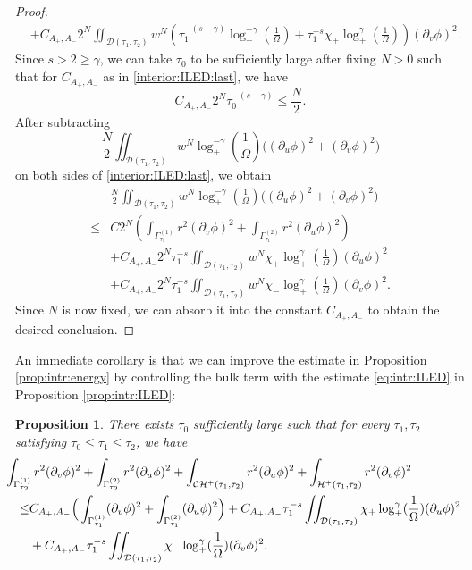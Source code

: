 \documentclass[10pt, reqno]{amsart}
\newtheorem{proposition}[theorem]{Proposition}
\theoremstyle{definition}
\theoremstyle{remark}
\numberwithin{equation}{section}
\newcommand{\rd}{\partial}
\newcommand{\bb}{\Big}
\newcommand{\0}{\emptyset}
\newcommand{\gmm}{\gamma}
\newcommand{\Gmm}{\Gamma}
\newcommand{\Omg}{\Omega}
\newcommand{\calC}{\mathcal C}
\newcommand{\calD}{\mathcal D}
\newcommand{\calH}{\mathcal H}
\newcommand{\f}{\frac}
\newcommand{\CH}{\calC \calH^{+}}		%
\newcommand{\EH}{\calH^{+}}
\begin{document}
\begin{proof}
\begin{equation}
\begin{split}
	&+C_{A_+,A_-} 2^N \iint_{\calD(\tau_{1}, \tau_{2})} w^N \left( \tau_1^{-(s-\gmm)} \log_+^{-\gamma}(\f{1}{\Omg})+ \tau_1^{-s} \chi_+\log_+^{\gamma}(\f{1}{\Omg}) \right) (\rd_v\phi)^2.
\end{split}
\end{equation}
Since $s>2 \geq \gmm$, we can take $\tau_0$ to be sufficiently large after fixing $N>0$ such that for $C_{A_+,A_-}$ as in \eqref{interior:ILED:last}, we have
$$ C_{A_+,A_-} 2^N \tau_0^{-(s-\gmm)} \leq \f{N}2.$$
After subtracting
$$\f N2\iint_{\calD(\tau_{1}, \tau_{2})} w^{N} \log_+^{-\gamma}(\f 1{\Omg}) \bb( (\rd_{u} \phi)^{2} + (\rd_{v} \phi)^{2} \bb)$$
on both sides of \eqref{interior:ILED:last}, we obtain
\begin{equation*}
\begin{split}
&\frac{N}{2} \iint_{\calD(\tau_{1}, \tau_{2})} w^{N} \log_+^{-\gamma}(\f 1{\Omg}) \bb( (\rd_{u} \phi)^{2} + (\rd_{v} \phi)^{2} \bb)\\
\leq &C 2^N\left(\int_{\Gmm^{(1)}_{\tau_{1}}} r^{2} (\rd_{v} \phi)^{2} + \int_{\Gmm^{(2)}_{\tau_{1}}} r^{2} (\rd_{u} \phi)^{2}\right)\\
& +C_{A_+,A_-} 2^N\tau_1^{-s}\iint_{\calD(\tau_{1}, \tau_{2})} w^N \chi_+\log_+^{\gamma}(\f{1}{\Omg})(\rd_u\phi)^2\\
	&+C_{A_+,A_-} 2^N\tau_1^{-s}\iint_{\calD(\tau_{1}, \tau_{2})} w^N \chi_-\log_+^{\gamma}(\f{1}{\Omg})(\rd_v\phi)^2.
\end{split}
\end{equation*}
Since $N$ is now fixed, we can absorb it into the constant $C_{A_+,A_-}$ to obtain the desired conclusion.
\end{proof}
An immediate corollary is that we can improve the estimate in Proposition \ref{prop:intr:energy} by controlling the bulk term with the estimate \eqref{eq:intr:ILED} in Proposition \ref{prop:intr:ILED}:
\begin{proposition} \label{prop:intr:energy.1}  
There exists $\tau_0$ sufficiently large such that for every $\tau_{1}, \tau_{2}$ satisfying $\tau_0 \leq \tau_{1} \leq \tau_{2}$, we have
\begin{equation} \label{eq:intr:energy.1}
\begin{aligned}
&\hskip-2em
	\int_{\Gmm_{\tau_{2}}^{(1)}} r^{2} (\rd_{v} \phi)^{2} + \int_{\Gmm_{\tau_{2}}^{(2)}} r^{2} (\rd_{u} \phi)^{2} 
	+ \int_{\CH(\tau_{1}, \tau_{2})} r^{2} (\rd_{u} \phi)^{2} + \int_{\EH(\tau_1,\tau_2)} r^{2} (\rd_{v} \phi)^{2} \\
	\leq &C_{A_+,A_-} \bb( \int_{\Gmm^{(1)}_{\tau_{1}}} (\rd_{v} \phi)^{2} + \int_{\Gmm^{(2)}_{\tau_{1}}} (\rd_{u} \phi)^{2} \bb)+C_{A_+,A_-}\tau_1^{-s}\iint_{\calD(\tau_{1}, \tau_{2})} \chi_+\log_+^{\gamma}(\f{1}{\Omg})(\rd_u\phi)^2\\
	&+C_{A_+,A_-}\tau_1^{-s}\iint_{\calD(\tau_{1}, \tau_{2})} \chi_-\log_+^{\gamma}(\f{1}{\Omg})(\rd_v\phi)^2.
\end{aligned}
\end{equation}
\end{proposition}
\end{document}
